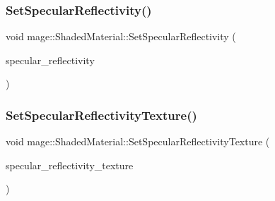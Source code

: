 \hypertarget{structmage_1_1_shaded_material_acfe55ee6398b1255d48d7e72a543f127}{}\label{structmage_1_1_shaded_material_acfe55ee6398b1255d48d7e72a543f127} 
\subsubsection{\texorpdfstring{Set\+Specular\+Reflectivity()}{SetSpecularReflectivity()}\hspace{0.1cm}{\footnotesize\ttfamily [2/2]}}
{\footnotesize\ttfamily void mage\+::\+Shaded\+Material\+::\+Set\+Specular\+Reflectivity (\begin{DoxyParamCaption}\item[{\hyperlink{structmage_1_1_r_g_b_spectrum}{R\+G\+B\+Spectrum} \&\&}]{specular\+\_\+reflectivity }\end{DoxyParamCaption})\hspace{0.3cm}{\ttfamily [noexcept]}}

\hypertarget{structmage_1_1_shaded_material_a8bd9bf0a0b1f636a74d3452c58b5b98d}{}\label{structmage_1_1_shaded_material_a8bd9bf0a0b1f636a74d3452c58b5b98d} 
\subsubsection{\texorpdfstring{Set\+Specular\+Reflectivity\+Texture()}{SetSpecularReflectivityTexture()}}
{\footnotesize\ttfamily void mage\+::\+Shaded\+Material\+::\+Set\+Specular\+Reflectivity\+Texture (\begin{DoxyParamCaption}\item[{\hyperlink{namespacemage_a1e01ae66713838a7a67d30e44c67703e}{Shared\+Ptr}$<$ \hyperlink{classmage_1_1_texture}{Texture} $>$}]{specular\+\_\+reflectivity\+\_\+texture }\end{DoxyParamCaption})}

\hypertarget{structmage_1_1_shaded_material_a8be0968eae5daf3d566ee063925671c6}{}\label{structmage_1_1_shaded_material_a8be0968eae5daf3d566ee063925671c6} 

